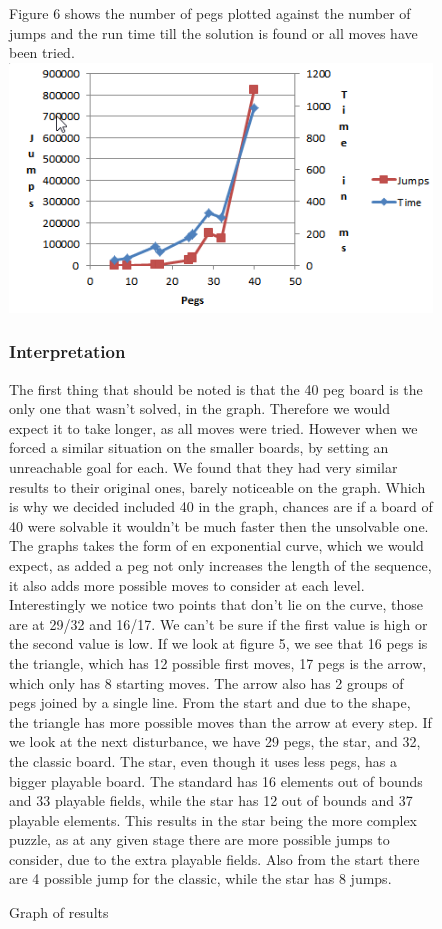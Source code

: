 \documentclass[11pt]{article}
\begin{document}
\begin{figure}
Figure 6 shows the number of pegs plotted against the number of jumps and the run time till the solution is found or all moves have been tried.\newline
\newline
\includegraphics[width=12cm]{6}
\caption{Graph of results} 
\label{fig: 6}

\subsubsection{Interpretation}
The first thing that should be noted is that the 40 peg board is the only one that wasn't solved, in the graph. Therefore we would expect it to take longer, as all moves were tried. However when we forced a similar situation on the smaller boards, by setting an unreachable goal for each. We found that they had very similar results to their original ones, barely noticeable on the graph. Which is why we decided included 40 in the graph, chances are if a board of 40 were solvable it wouldn't be much faster then the unsolvable one. 
The graphs takes the form of en exponential curve, which we would expect, as added a peg not only increases the length of the sequence, it also adds more possible moves to consider at each level.
Interestingly we notice two points that don't lie on the curve, those are at 29/32 and 16/17. We can't be sure if the first value is high or the second value is low. If we look at figure 5, we see that 16 pegs is the triangle, which has 12 possible first moves, 17 pegs is the arrow, which only has 8 starting moves. The arrow also has 2 groups of pegs joined by a single line. From the start and due to the shape, the triangle has more possible moves than the arrow at every step.\newline
 If we look at the next disturbance, we have 29 pegs, the star, and 32, the classic board. The star, even though it uses less pegs, has a bigger playable board. The standard has 16 elements out of bounds and 33 playable fields, while the star has 12 out of bounds and 37 playable elements. This results in the star being the more complex puzzle, as at any given stage there are more possible jumps to consider, due to the extra playable fields. Also from the start there are 4 possible jump for the classic, while the star has 8 jumps.\\
\end{figure}
\end{document}
